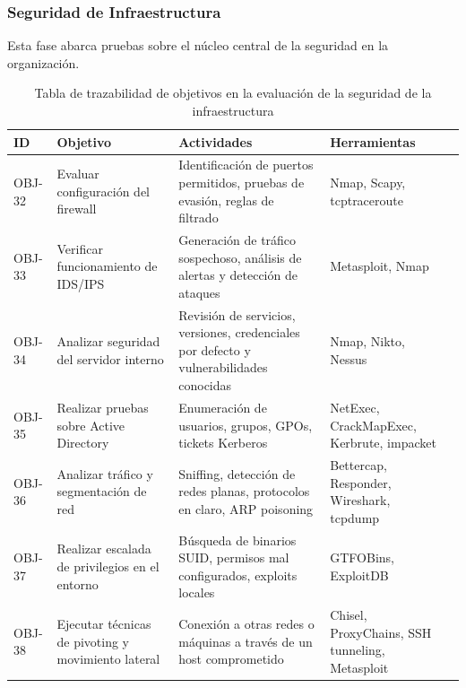 \documentclass[a4paper, 10pt]{article}
\begin{document}
\subsubsection{Seguridad de Infraestructura}

Esta fase abarca pruebas sobre el núcleo central de la seguridad en la organización.

\begin{table}[H]
\centering
\renewcommand{\arraystretch}{1.4}
\begin{tabular}{|p{1.2cm}|p{4.2cm}|p{4.8cm}|p{3.8cm}|p{2.3cm}|}
\hline
\textbf{ID} & \textbf{Objetivo} & \textbf{Actividades} & \textbf{Herramientas}  \\
\hline
OBJ-32 & Evaluar configuración del firewall & Identificación de puertos permitidos, pruebas de evasión, reglas de filtrado & Nmap, Scapy, tcptraceroute  \\
\hline
OBJ-33 & Verificar funcionamiento de IDS/IPS & Generación de tráfico sospechoso, análisis de alertas y detección de ataques & Metasploit, Nmap  \\
\hline
OBJ-34 & Analizar seguridad del servidor interno & Revisión de servicios, versiones, credenciales por defecto y vulnerabilidades conocidas & Nmap, Nikto, Nessus  \\
\hline
OBJ-35 & Realizar pruebas sobre Active Directory & Enumeración de usuarios, grupos, GPOs, tickets Kerberos & NetExec, CrackMapExec, Kerbrute, impacket  \\
\hline
OBJ-36 & Analizar tráfico y segmentación de red & Sniffing, detección de redes planas, protocolos en claro, ARP poisoning & Bettercap, Responder, Wireshark, tcpdump  \\
\hline
OBJ-37 & Realizar escalada de privilegios en el entorno & Búsqueda de binarios SUID, permisos mal configurados, exploits locales & GTFOBins, ExploitDB  \\
\hline
OBJ-38 & Ejecutar técnicas de pivoting y movimiento lateral & Conexión a otras redes o máquinas a través de un host comprometido & Chisel, ProxyChains, SSH tunneling, Metasploit  \\
\hline
\end{tabular}
\caption{Tabla de trazabilidad de objetivos en la evaluación de la seguridad de la infraestructura}
\end{table}
\end{document}
